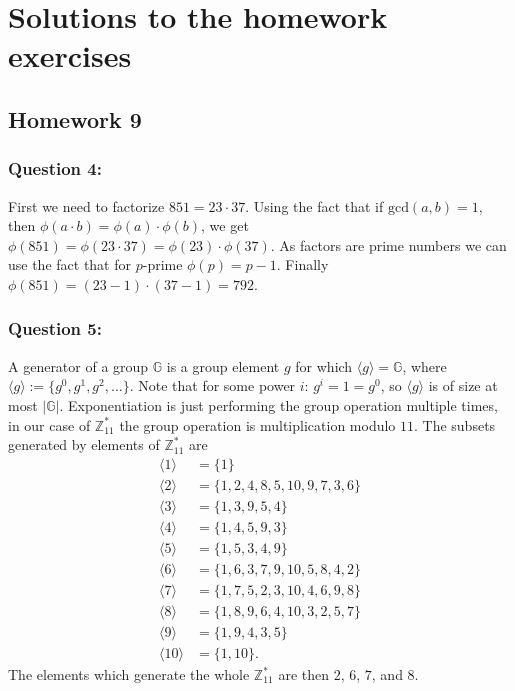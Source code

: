 \documentclass{article}
\numberwithin{defn}{section}
\numberwithin{equation}{section}
\begin{document}
\section*{Solutions to the homework exercises}

\subsection*{Homework 9}


	\subsubsection*{Question 4:} 
		First we need to factorize $851=23\cdot 37$. Using the fact that if $\text{gcd}(a,b)=1$, then $\phi(a\cdot b)=\phi(a)\cdot\phi(b)$, we get $\phi(851)=\phi(23\cdot 37)=\phi(23)\cdot\phi( 37)$. As factors are prime numbers we can use the fact that for $p$-prime $\phi(p)=p-1$. Finally $\phi(851)=(23-1)\cdot(37-1)=792$.
	\subsubsection*{Question 5:}
		A generator of a group $\mathbb{G}$ is a group element $g$ for which $\langle g\rangle=\mathbb{G}$, where $\langle g \rangle:=\{ g^0,g^1,g^2,\dots  \}$. Note that for some power $i$: $g^i=1=g^0$, so $\langle g \rangle$ is of size at most $|\mathbb{G}|$. Exponentiation is just performing the group operation multiple times, in our case of $\mathbb{Z}_{11}^*$ the group operation is multiplication modulo $11$. The subsets generated by elements of $\mathbb{Z}_{11}^*$ are
		\begin{align*}
		\langle 1 \rangle &= \{1\}\\
		\langle 2 \rangle &= \{1, 2, 4, 8, 5, 10, 9, 7, 3, 6\}\\
		\langle 3 \rangle &= \{1, 3, 9, 5, 4\}\\
		\langle 4 \rangle &= \{1, 4, 5, 9, 3\}\\
		\langle 5 \rangle &= \{1, 5, 3, 4, 9\}\\
		\langle 6 \rangle &= \{1, 6, 3, 7, 9, 10, 5, 8, 4, 2\}\\
		\langle 7 \rangle &= \{1, 7, 5, 2, 3, 10, 4, 6, 9, 8\}\\
		\langle 8 \rangle &= \{1, 8, 9, 6, 4, 10, 3, 2, 5, 7\}\\
		\langle 9 \rangle &= \{1, 9, 4, 3, 5\}\\
		\langle 10 \rangle &= \{1, 10\}.
		\end{align*}
		The elements which generate the whole $\mathbb{Z}_{11}^*$ are then $2$, $6$, $7$, and $8$.

\end{document}
